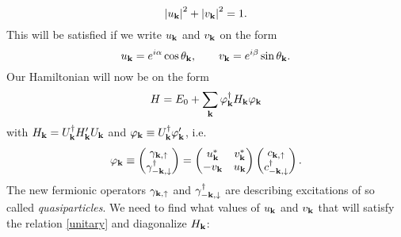 \begin{equation}
\left| u_{\mathbf{k}} \right |^2 + \left| v_{\mathbf{k}} \right |^2 = 1.
\label{unitary}
\end{equation}
This will be satisfied if we write $u_{\mathbf{k}}$ and $v_{\mathbf{k}}$ on the form
\begin{equation}
u_{\mathbf{k}} = e^{i\alpha}\cos\theta_{\mathbf{k}},
\qquad
v_{\mathbf{k}} = e^{i\beta}\sin\theta_{\mathbf{k}}.
\label{uv}
\end{equation}
Our Hamiltonian will now be on the form 
\begin{equation}
H = E_0 + \sum_{\mathbf{k}}\varphi_{\mathbf{k}}^{\dagger}H_{\mathbf{k}}\varphi_{\mathbf{k}}
\end{equation}
with $H_{\mathbf{k}} = U_{\mathbf{k}}^{\dagger}H_{\mathbf{k}}'U_{\mathbf{k}}$ and  $\varphi_{\mathbf{k}} \equiv U_{\mathbf{k}}^{\dagger}\varphi'_{\mathbf{k}}$, i.e.
\begin{equation}
\varphi_{\mathbf{k}} \equiv 
\begin{pmatrix}
    \gamma_{\bf{k},\uparrow} \\ \gamma_{-\bf{k},\downarrow}^{\dagger}
\end{pmatrix}
=
\begin{pmatrix}
    u_{\mathbf{k}}^* & v_{\mathbf{k}}^*\\
    -v_{\mathbf{k}} & u_{\mathbf{k}}
\end{pmatrix}
\begin{pmatrix}
    c_{\bf{k},\uparrow} \\ c_{-\bf{k},\downarrow}^{\dagger}
\end{pmatrix}.
\label{quasi}
\end{equation}
 The new fermionic operators $\gamma_{\bf{k},\uparrow}$ and $\gamma_{-\bf{k},\downarrow}^{\dagger}$ are describing excitations of so called \textit{quasiparticles}. We need to find what values of $u_{\mathbf{k}}$ and $v_{\mathbf{k}}$ that will satisfy the relation \eqref{unitary} and diagonalize  $H_{\mathbf{k}}$:
